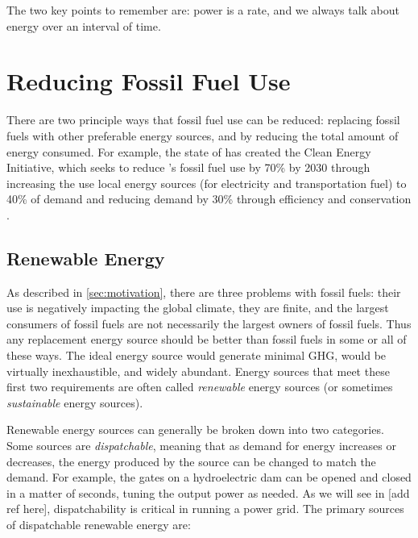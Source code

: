 The two key points to remember are: power is a rate, and we always talk about energy over an interval of time.

\section{Reducing Fossil Fuel Use}

There are two principle ways that fossil fuel use can be reduced: replacing fossil fuels with other preferable energy sources, and by reducing the total amount of energy consumed. For example, the state of \Hawaii has created the \Hawaii Clean Energy Initiative, which seeks to reduce \Hawaii's fossil fuel use by 70\% by 2030 through increasing the use local energy sources (for electricity and transportation fuel) to 40\% of demand and reducing demand by 30\% through efficiency and conservation \cite{HCEI-website}.

\subsection{Renewable Energy}

As described in \autoref{sec:motivation}, there are three problems with fossil fuels: their use is negatively impacting the global climate, they are finite, and the largest consumers of fossil fuels are not necessarily the largest owners of fossil fuels. Thus any replacement energy source should be better than fossil fuels in some or all of these ways. The ideal energy source would generate minimal GHG, would be virtually inexhaustible, and widely abundant. Energy sources that meet these first two requirements are often called \emph{renewable} energy sources (or sometimes \emph{sustainable} energy sources).

Renewable energy sources can generally be broken down into two categories. Some sources are \emph{dispatchable}, meaning that as demand for energy increases or decreases, the energy produced by the source can be changed to match the demand. For example, the gates on a hydroelectric dam can be opened and closed in a matter of seconds, tuning the output power as needed. As we will see in [add ref here], dispatchability is critical in running a power grid. The primary sources of dispatchable renewable energy are:

